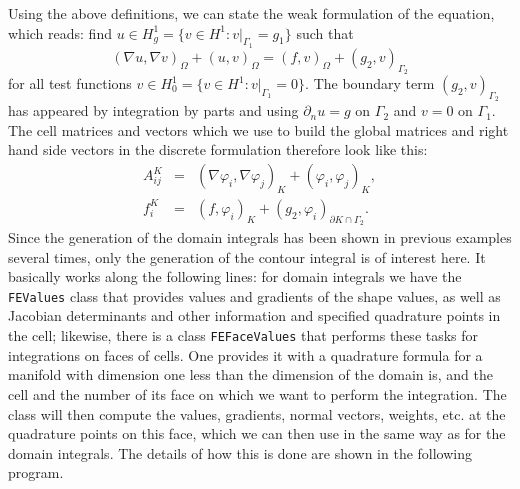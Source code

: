 \documentclass{article}
\begin{document}
Using the above definitions, we can state the weak formulation of the
equation, which reads: find $u\in H^1_g=\{v\in H^1: v|_{\Gamma_1}=g_1\}$ such
that
$$
  {(\nabla u, \nabla v)}_\Omega + {(u,v)}_\Omega
  =
  {(f,v)}_\Omega + {(g_2,v)}_{\Gamma_2}
$$
for all test functions $v\in H^1_0=\{v\in H^1: v|_{\Gamma_1}=0\}$. The
boundary term ${(g_2,v)}_{\Gamma_2}$ has appeared by integration by parts and
using $\partial_n u=g$ on $\Gamma_2$ and $v=0$ on $\Gamma_1$. The cell
matrices and vectors which we use to build the global matrices and right hand
side vectors in the discrete formulation therefore look like this:
\begin{eqnarray*}
  A_{ij}^K &=& \left(\nabla \varphi_i, \nabla \varphi_j\right)_K
              +\left(\varphi_i, \varphi_j\right)_K,
  \\
  f_i^K &=& \left(f,\varphi_i\right)_K
           +\left(g_2, \varphi_i\right)_{\partial K\cap \Gamma_2}.
\end{eqnarray*}
Since the generation of the domain integrals has been shown in previous
examples several times, only the generation of the contour integral is of
interest here. It basically works along the following lines: for domain
integrals we have the \texttt{FEValues} class that provides values and
gradients of the shape values, as well as Jacobian determinants and other
information and specified quadrature points in the cell; likewise, there is a
class \texttt{FEFaceValues} that performs these tasks for integrations on
faces of cells. One provides it with a quadrature formula for a manifold with
dimension one less than the dimension of the domain is, and the cell and the
number of its face on which we want to perform the integration. The class will
then compute the values, gradients, normal vectors, weights, etc. at the
quadrature points on this face, which we can then use in the same way as for
the domain integrals. The details of how this is done are shown in the
following program.
\end{document}
